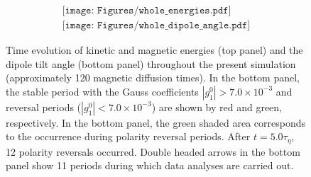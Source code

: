 \begin{figure}[ht]
\begin{center}
\[
\begin{array}{c}
\texttt{[image: Figures/whole\_energies.pdf]} \\
\texttt{[image: Figures/whole\_dipole\_angle.pdf]}
\end{array}
\]
\end{center}
\caption{
Time evolution of kinetic and magnetic energies (top panel) and the dipole tilt angle (bottom panel) throughout the present simulation (approximately 120 magnetic diffusion times). In the bottom panel, the stable period with the Gauss coefficients $|g_{1}^{0}| > 7.0 \times 10^{-3}$ and reversal periods ($|g_{1}^{0}| < 7.0 \times 10^{-3}$) are shown by red and green, respectively. 
In the bottom panel, the green shaded area corresponds to the occurrence during polarity reversal periods.
After $t = 5.0 \tau_{\eta}$, 12 polarity reversals occurred.
Double headed arrows in the bottom panel show 11 %
periods during which data analyses are carried out.
}
\label{fig:sph_shell_275_full}
\end{figure}